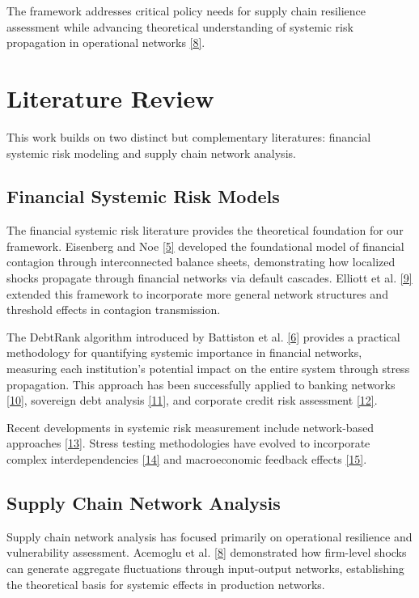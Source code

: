 \documentclass[a4 paper, 11pt,twoside]{article}
\newcommand{\0}{\Bf{0}}
\theoremstyle{definition}
\begin{document}
The framework addresses critical policy needs for supply chain resilience assessment while advancing theoretical understanding of systemic risk propagation in operational networks \hyperref[ref8]{[8]}.

\section{Literature Review}

This work builds on two distinct but complementary literatures: financial systemic risk modeling and supply chain network analysis.

\subsection{Financial Systemic Risk Models}

The financial systemic risk literature provides the theoretical foundation for our framework. Eisenberg and Noe \hyperref[ref5]{[5]} developed the foundational model of financial contagion through interconnected balance sheets, demonstrating how localized shocks propagate through financial networks via default cascades. Elliott et al. \hyperref[ref9]{[9]} extended this framework to incorporate more general network structures and threshold effects in contagion transmission.

The DebtRank algorithm introduced by Battiston et al. \hyperref[ref6]{[6]} provides a practical methodology for quantifying systemic importance in financial networks, measuring each institution's potential impact on the entire system through stress propagation. This approach has been successfully applied to banking networks \hyperref[ref10]{[10]}, sovereign debt analysis \hyperref[ref11]{[11]}, and corporate credit risk assessment \hyperref[ref12]{[12]}.

Recent developments in systemic risk measurement include network-based approaches \hyperref[ref13]{[13]}. Stress testing methodologies have evolved to incorporate complex interdependencies \hyperref[ref14]{[14]} and macroeconomic feedback effects \hyperref[ref15]{[15]}.

\subsection{Supply Chain Network Analysis}

Supply chain network analysis has focused primarily on operational resilience and vulnerability assessment. Acemoglu et al. \hyperref[ref8]{[8]} demonstrated how firm-level shocks can generate aggregate fluctuations through input-output networks, establishing the theoretical basis for systemic effects in production networks.
\end{document}
